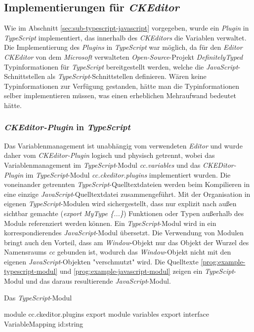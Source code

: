 \subsection{Implementierungen für \emph{CKEditor}}
Wie im Abschnitt \ref{sec:sub-typescript-javascript} vorgegeben, wurde ein \emph{Plugin} in \emph{TypeScript} implementiert, das innerhalb des \emph{CKEditors} die Variablen verwaltet. Die Implementierung des \emph{Plugins} in \emph{TypeScript} war möglich, da für den \emph{Editor CKEditor} von dem \emph{Microsoft} verwalteten \emph{Open-Source}-Projekt \emph{DefinitelyTyped} Typinformationen für \emph{TypeScript} bereitgestellt werden, welche die \emph{JavaScript}-Schnittstellen als \emph{TypeScript}-Schnittstellen definieren. Wären keine Typinformationen zur Verfügung gestanden, hätte man die Typinformationen selber implementieren müssen, was einen erheblichen Mehraufwand bedeutet hätte.
 
\subsubsection{\emph{CKEditor-Plugin} in \emph{TypeScript}}
Das Variablenmanagement ist unabhängig vom verwendeten \emph{Editor} und wurde daher vom \emph{CKEditor-Plugin} logisch und physisch getrennt, wobei das Variablenmanagement im \emph{TypeScript}-Modul \emph{cc.variables} und das \emph{CKEDitor-Plugin} im \emph{TypeScript}-Modul \emph{cc.ckeditor.plugins} implementiert wurden. 
\newline
\newline
Die voneinander getrennten \emph{TypeScript}-Quelltextdateien werden beim Kompilieren in eine einzige \emph{JavaScript}-Quelltextdatei zusammengeführt. Mit der Organisation in eigenen \emph{TypeScript}-Modulen wird sichergestellt, dass nur explizit nach außen sichtbar gemachte (\emph{export MyType \{...\}}) Funktionen oder Typen außerhalb des Moduls referenziert werden können. Ein \emph{TypeScript}-Modul wird in ein korrespondierendes \emph{JavaScript}-Modul übersetzt. Die Verwendung von Modulen bringt auch den Vorteil, dass am \emph{Window}-Objekt nur das Objekt der Wurzel des Namensraums \emph{cc} gebunden ist, wodurch das \emph{Window}-Objekt nicht mit den eigenen \emph{JavaScript}-Objekten "verschmutzt" wird. Die Quelltexte \ref{prog:example-typescript-modul} und \ref{prog:example-javascript-modul} zeigen ein \emph{TypeScipt}-Modul und das daraus resultierende \emph{JavaScript}-Modul.
\newpage

\begin{program}[h]
\caption{Das \emph{TypeScript}-Modul}
\label{prog:example-typescript-modul}
\begin{JsCode}[numbers=none]
module cc.ckeditor.plugins {
	export module variables {
		export interface VariableMapping {
	        id:string
		}
	}
}                  
\end{JsCode}
\end{program}

